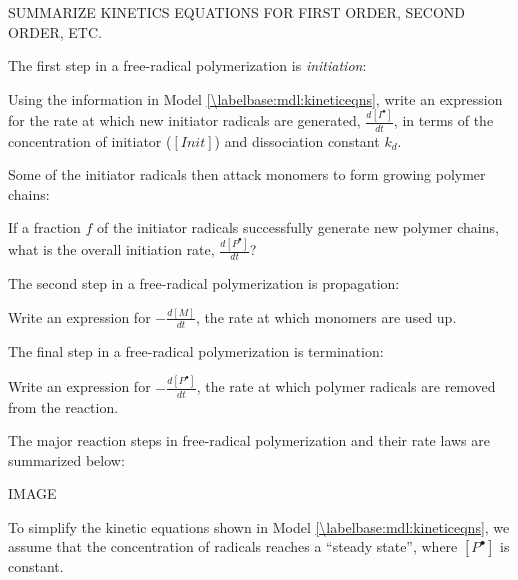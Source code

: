 \begin{activity}
\begin{instructornotes}
\end{instructornotes}


\begin{model}
	\label{\labelbase:mdl:kineticeqns}

	SUMMARIZE KINETICS EQUATIONS FOR FIRST ORDER, SECOND ORDER, ETC.

\end{model}


\begin{ctqs}

	\question The first step in a free-radical polymerization is \emph{initiation}:
	
		Using the information in Model \ref{\labelbase:mdl:kineticeqns}, write an expression for the rate at which new initiator radicals are generated, $\frac{d[I^{\bullet}]}{dt}$, in terms of the concentration of initiator ($[Init]$) and dissociation constant $k_d$.
		
	\question Some of the initiator radicals then attack monomers to form growing polymer chains:
	
		If a fraction $f$ of the initiator radicals successfully generate new polymer chains, what is the overall initiation rate, $\frac{d[P^{\bullet}]}{dt}$?
		
	\question The second step in a free-radical polymerization is propagation:
	
		Write an expression for $-\frac{d[M]}{dt}$, the rate at which monomers are used up.
		
	\question The final step in a free-radical polymerization is termination:
	
		Write an expression for $-\frac{d[P^{\bullet}]}{dt}$, the rate at which polymer radicals are removed from the reaction.

\end{ctqs}



\begin{model}
\label{\labelbase:mdl:kineticssummary}

	The major reaction steps in free-radical polymerization and their rate laws are summarized below:
	
	IMAGE

\end{model}

\begin{ctqs}

	\question To simplify the kinetic equations shown in Model \ref{\labelbase:mdl:kineticeqns}, we assume that the concentration of radicals reaches a ``steady state'', where $[P^{\bullet}]$ is constant.
	

\end{ctqs}
\end{activity}
